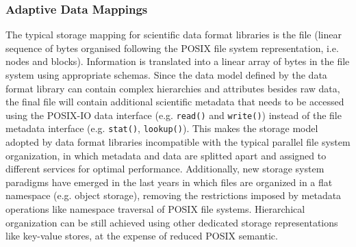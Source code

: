 






\subsubsection{Adaptive Data Mappings}
The typical storage mapping for scientific data format libraries is the file (linear sequence of bytes organised following the POSIX file system representation, i.e. nodes and blocks). Information is translated into a linear array of bytes in the file system using appropriate schemas. Since the data model defined by the data format library can contain complex hierarchies and attributes besides raw data, the final file will contain additional scientific metadata that needs to be accessed using the POSIX-IO data interface (e.g. \texttt{read()} and \texttt{write()}) instead of the file metadata interface (e.g. \texttt{stat()}, \texttt{lookup()}). This makes the storage model adopted by data format libraries incompatible with the typical parallel file system organization, in which metadata and data are splitted apart and assigned to different services for optimal performance. Additionally, new storage system paradigms have emerged in the last years in which files are organized in a flat namespace (e.g. object storage), removing the restrictions imposed by metadata operations like namespace traversal of POSIX file systems. Hierarchical organization can be still achieved using other dedicated storage representations like key-value stores, at the expense of reduced POSIX semantic.


